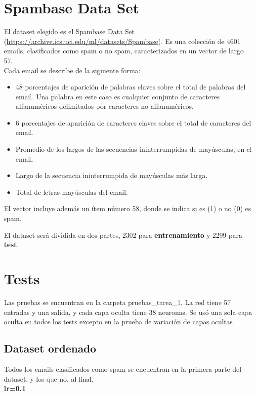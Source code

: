 \documentclass[letterpaper,11pt]{article} %
\begin{document}
\section{Spambase Data Set}
El dataset elegido es el Spambase Data Set (\url{https://archive.ics.uci.edu/ml/datasets/Spambase}). Es una colección de 4601 emails, clasificados como spam o no spam, caracterizados en un vector de largo 57. \\

Cada email se describe de la siguiente forma:
\begin{itemize}
\item 48 porcentajes de aparición de palabras claves sobre el total de palabras del email. Una palabra en este caso es cualquier conjunto de caracteres alfanuméricos delimitados por caracteres no alfanuméricos.
\item 6 porcentajes de aparición de caracteres claves sobre el total de caracteres del email.
\item Promedio de los largos de las secuencias ininterrumpidas de mayúsculas, en el email.
\item Largo de la secuencia ininterrumpida de mayúsculas más larga.
\item Total de letras mayúsculas del email.

\end{itemize}
El vector incluye además un ítem número 58, donde se indica si es (1) o no (0) es spam.

El dataset será dividida en dos partes, 2302 para \textbf{entrenamiento} y 2299 para \textbf{test}.

\section{Tests}

Las pruebas se encuentran en la carpeta pruebas\_tarea\_1. La red tiene 57 entradas y una salida, y cada capa oculta tiene 38 neuronas. Se usó una sola capa oculta en todos los tests excepto en la prueba de variación de capas ocultas

\subsection{Dataset ordenado}
Todos los emails clasificados como spam se encuentran en la primera parte del dataset, y los que no, al final.\\

\textbf{lr=0.1}
\end{document}
